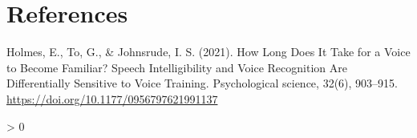 \documentclass[
  english,
  man]{apa6}
\newlength{\cslhangindent}
\newenvironment{CSLReferences}[2] %
 {%
  \setlength{\parindent}{0pt}
  \ifodd #1 \everypar{\setlength{\hangindent}{\cslhangindent}}\ignorespaces\fi
  \ifnum #2 > 0
  \setlength{\parskip}{#2\baselineskip}
  \fi
 }%
 {}
\begin{document}
\newpage

\hypertarget{references}{%
\section{References}\label{references}}

Holmes, E., To, G., \& Johnsrude, I. S. (2021). How Long Does
It Take for a Voice to Become Familiar? Speech
Intelligibility and Voice Recognition Are Differentially
Sensitive to Voice Training. Psychological science, 32(6),
903--915. \url{https://doi.org/10.1177/0956797621991137}

\begingroup
\setlength{\parindent}{-0.5in}
\setlength{\leftskip}{0.5in}

\hypertarget{refs}{}
\begin{CSLReferences}{0}{0}
\end{CSLReferences}

\endgroup
\end{document}
